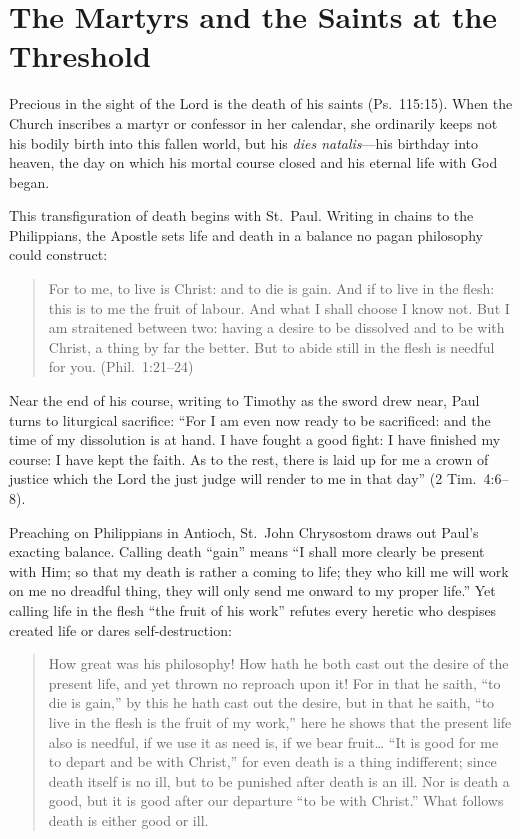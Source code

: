 \section{The Martyrs and the Saints at the Threshold}

Precious in the sight of the Lord is the death of his saints (Ps.\ 115:15). When the Church inscribes a martyr or confessor in her calendar, she ordinarily keeps not his bodily birth into this fallen world, but his \emph{dies natalis}---his birthday into heaven, the day on which his mortal course closed and his eternal life with God began.

This transfiguration of death begins with St.\ Paul. Writing in chains to the Philippians, the Apostle sets life and death in a balance no pagan philosophy could construct:

\begin{quote}
For to me, to live is Christ: and to die is gain. And if to live in the flesh: this is to me the fruit of labour. And what I shall choose I know not. But I am straitened between two: having a desire to be dissolved and to be with Christ, a thing by far the better. But to abide still in the flesh is needful for you. (Phil.\ 1:21--24)
\end{quote}

Near the end of his course, writing to Timothy as the sword drew near, Paul turns to liturgical sacrifice: ``For I am even now ready to be sacrificed: and the time of my dissolution is at hand. I have fought a good fight: I have finished my course: I have kept the faith. As to the rest, there is laid up for me a crown of justice which the Lord the just judge will render to me in that day'' (2 Tim.\ 4:6--8).

Preaching on Philippians in Antioch, St.\ John Chrysostom draws out Paul's exacting balance. Calling death ``gain'' means ``I shall more clearly be present with Him; so that my death is rather a coming to life; they who kill me will work on me no dreadful thing, they will only send me onward to my proper life.'' Yet calling life in the flesh ``the fruit of his work'' refutes every heretic who despises created life or dares self-destruction:

\begin{quote}
How great was his philosophy! How hath he both cast out the desire of the present life, and yet thrown no reproach upon it! For in that he saith, ``to die is gain,'' by this he hath cast out the desire, but in that he saith, ``to live in the flesh is the fruit of my work,'' here he shows that the present life also is needful, if we use it as need is, if we bear fruit\ldots{} ``It is good for me to depart and be with Christ,'' for even death is a thing indifferent; since death itself is no ill, but to be punished after death is an ill. Nor is death a good, but it is good after our departure ``to be with Christ.'' What follows death is either good or ill.
\end{quote}

